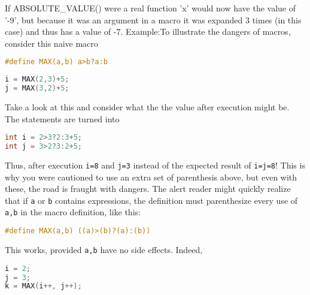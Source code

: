 If ABSOLUTE\_VALUE() were a real function 'x' would now have the value of '-9',
but because it was an argument in a macro it was expanded 3 times (in this
case) and thus has a value of -7.
Example:To illustrate the dangers of macros, consider this naive macro
\lstset{basicstyle=\scriptsize, numbers=left, captionpos=b, tabsize=4}
\begin{lstlisting}[caption=Section \thesection listing \arabic{preprocnt},language={C},
breaklines=true,xleftmargin=15pt, label=lst:section\thesection listing\arabic{preprocnt}]
#define MAX(a,b) a>b?a:b
\end{lstlisting}

\lstset{basicstyle=\scriptsize, numbers=left, captionpos=b, tabsize=4}
\begin{lstlisting}[caption=Section \thesection listing \arabic{preprocnt},language={C},
breaklines=true,xleftmargin=15pt, label=lst:section\thesection listing\arabic{preprocnt}]
i = MAX(2,3)+5;
j = MAX(3,2)+5;
\end{lstlisting}

Take a look at this and consider what the the value after execution might be.
The statements are turned into
\lstset{basicstyle=\scriptsize, numbers=left, captionpos=b, tabsize=4}
\begin{lstlisting}[caption=Section \thesection listing \arabic{preprocnt},language={C},
breaklines=true,xleftmargin=15pt, label=lst:section\thesection listing\arabic{preprocnt}]
int i = 2>3?2:3+5;
int j = 3>2?3:2+5;
\end{lstlisting}

Thus, after execution \texttt{i=8} and \texttt{j=3} instead of the expected
result of \texttt{i=j=8}! This is why you were cautioned to use an extra set of
parenthesis above, but even with these, the road is fraught with dangers. The
alert reader might quickly realize that if \texttt{a} or \texttt{b} contains
expressions, the definition must parenthesize every use of \texttt{a,b} in the
macro definition, like this:
\lstset{basicstyle=\scriptsize, numbers=left, captionpos=b, tabsize=4}
\begin{lstlisting}[caption=Section \thesection listing \arabic{preprocnt},language={C},
breaklines=true,xleftmargin=15pt, label=lst:section\thesection listing\arabic{preprocnt}]
#define MAX(a,b) ((a)>(b)?(a):(b))
\end{lstlisting}

This works, provided \texttt{a,b} have no side effects. Indeed, 
\lstset{basicstyle=\scriptsize, numbers=left, captionpos=b, tabsize=4}
\begin{lstlisting}[caption=Section \thesection listing \arabic{preprocnt},language={C},
breaklines=true,xleftmargin=15pt, label=lst:section\thesection listing\arabic{preprocnt}]
i = 2;
j = 3;
k = MAX(i++, j++);
\end{lstlisting}

